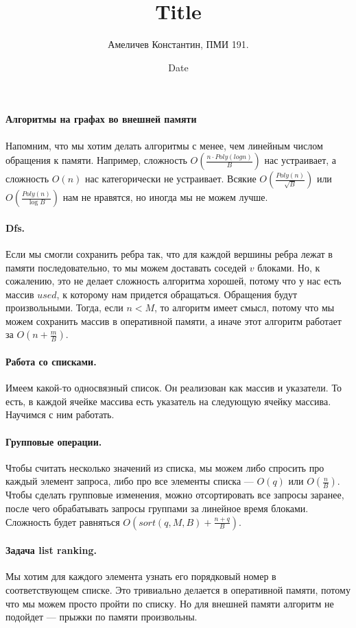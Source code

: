 \documentclass[12pt]{article}
\title{Title}
\author{Амеличев Константин, ПМИ 191.}
\date{Date}
\begin{document}
\paragraph{Алгоритмы на графах во внешней памяти} Напомним, что мы хотим делать алгоритмы с менее, чем линейным числом обращения к памяти. Например, сложность $O(\frac{n\cdot Poly(log n)}{B})$ нас устраивает, а сложность $O(n)$ нас категорически не устраивает. Всякие $O(\frac{Poly(n)}{\sqrt{B}})$ или $O(\frac{Poly(n)}{\log{B}})$ нам не нравятся, но иногда мы не можем лучше.


\paragraph{Dfs.} Если мы смогли сохранить ребра так, что для каждой вершины ребра лежат в памяти последовательно, то мы можем  доставать соседей $v$ блоками. Но, к сожалению, это не делает сложность алгоритма хорошей, потому что у нас есть массив $used$, к которому нам придется обращаться. Обращения будут произвольными. Тогда, если $n < M$, то алгоритм имеет смысл, потому что мы можем сохранить массив в оперативной памяти, а иначе этот алгоритм работает за $O(n + \frac{m}{B})$.

\paragraph{Работа со списками.} Имеем какой-то односвязный список. Он реализован как массив и указатели. То есть, в каждой ячейке массива есть указатель на следующую ячейку массива. Научимся с ним работать.

\paragraph{Групповые операции.} Чтобы считать несколько значений из списка, мы можем либо спросить про каждый элемент запроса, либо про все элементы списка --- $O(q)$ или $O(\frac{n}{B})$. Чтобы сделать групповые изменения, можно отсортировать все запросы заранее, после чего обрабатывать запросы группами за линейное время блоками. Сложность будет равняться $O(sort(q, M, B) + \frac{n + q}{B})$.

\paragraph{Задача list ranking.} Мы хотим для каждого элемента узнать его порядковый номер в соответствующем списке. Это тривиально делается в оперативной памяти, потому что мы можем просто пройти по списку. Но для внешней памяти алгоритм не подойдет --- прыжки по памяти произвольны. 
\end{document}
